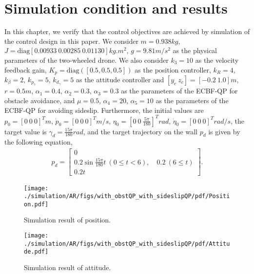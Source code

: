 \section{Simulation condition and results}
\label{chap:simulation}

In this chapter, we verify that the control objectives are achieved by simulation of the control design in this paper.
We consider $ m = 0.938 \si{kg} $, $ J=\mathrm{diag}[0.00933 ~ 0.00285 ~ 0.01130] \si{kg.m^2} $, $ g = 9.81 \si{m/s^2} $ as the physical parameters of the two-wheeled drone.
We also consider $ k_3 = 10 $ as the velocity feedback gain, $ K_p = \mathrm{diag}([0.5, 0.5 ,0.5]) $ as the position controller, $ k_R = 4 $, $ k_{\beta} = 2 $, $ k_{p_{\gamma}} = 5 $, $ k_{d_{\gamma}} = 5 $ as the attitude controller and $ [y_c ~ z_c] = [-0.2 ~ 1.0] \si{m} $, $ r = 0.5 \si{m} $, $ \alpha_1 = 0.4 $, $ \alpha_2 = 0.3 $, $ \alpha_3 = 0.3 $ as the parameters of the ECBF-QP for obstacle avoidance, and $ \mu = 0.5 $, $ \alpha_4 = 20 $, $ \alpha_5 = 10 $ as the parameters of the ECBF-QP for avoiding sideslip.
Furthermore, the initial values are $ p_0 = [0 ~ 0 ~ 0]^T \si{m} $, $ \dot{p}_0 = [0 ~ 0 ~ 0]^T \si{m/s} $, $ \eta_0 = [0 ~ 0 ~ \frac{5 \pi}{180}]^T \si{rad} $, $ \dot{\eta}_0 = [0 ~ 0 ~ 0]^T \si{rad/s} $, the target value is $ \gamma_d = \frac{15 \pi}{180} \si{rad} $, and the target trajectory on the wall $ p_d $ is given by the following equation,
\begin{align*}
      p_d =
      \begin{bmatrix}
        0\\
        0.2 \sin \frac{15 \pi}{180}t ~ ( 0 \leq t < 6) ,  \quad 0.2 ~ (6 \leq t)\\
        0.2t
      \end{bmatrix}.
\end{align*}

\begin{figure}[t]
\centering
\texttt{[image: ./simulation/AR/figs/with\_obstQP\_with\_sideslipQP/pdf/Position.pdf]}
\caption{Simulation result of position.}
\label{figs:simulation_result_of_position}
\end{figure}

\begin{figure}[t]
\centering
\texttt{[image: ./simulation/AR/figs/with\_obstQP\_with\_sideslipQP/pdf/Attitude.pdf]}
\caption{Simulation result of attitude.}
\label{figs:simulation_result_of_attitude}
\end{figure}
 
